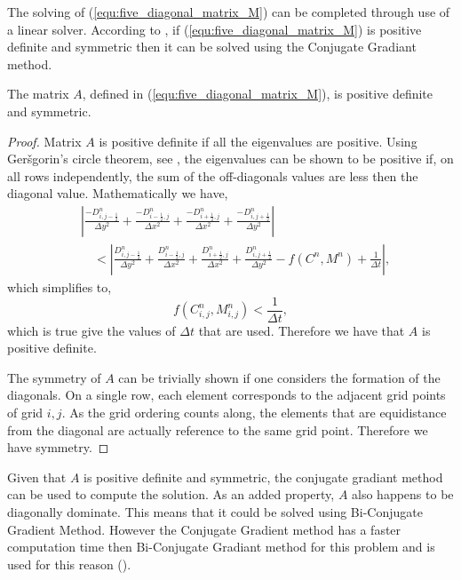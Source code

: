   The solving of (\ref{equ:five_diagonal_matrix_M}) can be completed through use of a linear solver. 
  According to \cite{barret1987templates}, if (\ref{equ:five_diagonal_matrix_M}) is positive definite and symmetric then it can be solved using the Conjugate Gradiant method.
  \begin{prop}
    The matrix $A$, defined in (\ref{equ:five_diagonal_matrix_M}), is positive definite and symmetric.
  \end{prop}
  \begin{proof}
    Matrix $A$ is positive definite if all the eigenvalues are positive. 
    Using Ger{\v s}gorin's circle theorem, see \cite{gerschgorin1931uber_die_abgrenzung}, the eigenvalues can be shown to be positive if, on all rows independently, the sum of the off-diagonals values are less then the diagonal value.
    Mathematically we have,
    \begin{equation}
      \begin{aligned}
      & \left| \frac{-D^n_{i,j-\frac{1}{2}}}{\Delta y ^2} + \frac{-D^n_{i-\frac{1}{2},j}}{\Delta x ^2} + \frac{-D^n_{i+\frac{1}{2},j}}{\Delta x ^2} + \frac{-D^n_{i,j+\frac{1}{2}}}{\Delta y ^2} \right| \\
      &\quad < \left| \frac{D^n_{i,j-\frac{1}{2}}}{\Delta y ^2} + \frac{D^n_{i-\frac{1}{2},j}}{\Delta x ^2} + \frac{D^n_{i+\frac{1}{2},j}}{\Delta x ^2} + \frac{D^n_{i,j+\frac{1}{2}}}{\Delta y ^2} - f(C^n, M^n) + \frac{1}{\Delta t} \right|, 
      \end{aligned}
    \end{equation}
    which simplifies to,
    \begin{equation}
      f(C^n_{i,j}, M^n_{i,j}) < \frac{1}{\Delta t},
    \end{equation}
    which is true give the values of $\Delta t$ that are used. Therefore we have that $A$ is positive definite.

    The symmetry of $A$ can be trivially shown if one considers the formation of the diagonals.
    On a single row, each element corresponds to the adjacent grid points of grid $i,j$.
    As the grid ordering counts along, the elements that are equidistance from the diagonal are actually reference to the same grid point. 
    Therefore we have symmetry. 

  \end{proof} 

  Given that $A$ is positive definite and symmetric, the conjugate gradiant method can be used to compute the solution.
  As an added property, $A$ also happens to be diagonally dominate.
  This means that it could be solved using Bi-Conjugate Gradient Method.
  However the Conjugate Gradient method has a faster computation time then Bi-Conjugate Gradiant method for this problem and is used for this reason (\cite{barret1987templates}).


